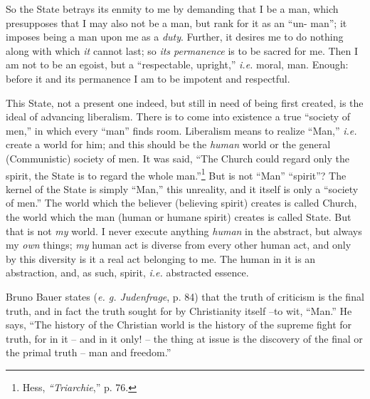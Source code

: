 \documentclass[12pt,a4paper]{book}
\begin{document}
So the State betrays its enmity to me by demanding that I be a man, which 
presupposes that I may also not be a man, but rank for it as an ``un- man''; 
it imposes being a man upon me as a \textit{duty}. Further, it desires me to 
do nothing along with which \textit{it} cannot last; so \textit{its 
permanence} is to be sacred for me. Then I am not to be an egoist, but a 
``respectable, upright,'' \textit{i.e.} moral, man. Enough: before it and 
its permanence I am to be impotent and respectful.

This State, not a present one indeed, but still in need of being first 
created, is the ideal of advancing liberalism. There is to come into existence 
a true ``society of men,'' in which every ``man'' finds room. Liberalism 
means to realize ``Man,'' \textit{i.e.} create a world for him; and this 
should be the \textit{human} world or the general (Communistic) society of 
men. It was said, ``The Church could regard only the spirit, the State is to 
regard the whole man.''\footnote{Hess, \textit{``Triarchie},'' p. 76.} But 
is not ``Man'' ``spirit''? The kernel of the State is simply ``Man,'' 
this unreality, and it itself is only a ``society of men.'' The world which 
the believer (believing spirit) creates is called Church, the world which the 
man (human or humane spirit) creates is called State. But that is not 
\textit{my} world. I never execute anything \textit{human} in the abstract, 
but always my \textit{own} things; \textit{my} human act is diverse from every 
other human act, and only by this diversity is it a real act belonging to me. 
The human in it is an abstraction, and, as such, spirit, \textit{i.e.} 
abstracted essence.

Bruno Bauer states (\textit{e. g. Judenfrage}, p. 84) that the truth of 
criticism is the final truth, and in fact the truth sought for by Christianity 
itself --to wit, ``Man.'' He says, ``The history of the Christian world is 
the history of the supreme fight for truth, for in it -- and in it only! -- 
the thing at issue is the discovery of the final or the primal truth -- man 
and freedom.''
\end{document}
